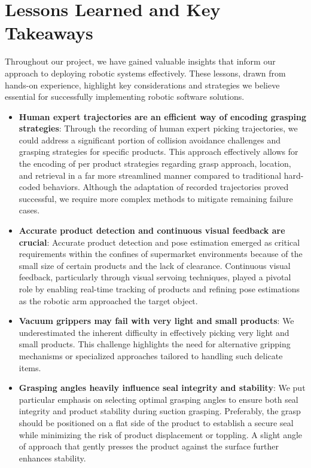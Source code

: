 \section{Lessons Learned and Key Takeaways}

Throughout our project, we have gained valuable insights that inform our approach to deploying robotic systems effectively. These lessons, drawn from hands-on experience, highlight key considerations and strategies we believe essential for successfully implementing robotic software solutions.

\begin{itemize}

    \item \textbf{Human expert trajectories are an efficient way of encoding grasping strategies}: 
    Through the recording of human expert picking trajectories, we could address a significant portion of collision avoidance challenges and grasping strategies for specific products. This approach effectively allows for the encoding of per product strategies regarding grasp approach, location, and retrieval in a far more streamlined manner compared to traditional hard-coded behaviors. Although the adaptation of recorded trajectories proved successful, we require more complex methods to mitigate remaining failure cases.
    
    \item \textbf{Accurate product detection and continuous visual feedback are crucial}:
    Accurate product detection and pose estimation emerged as critical requirements within the confines of supermarket environments because of the small size of certain products and the lack of clearance. Continuous visual feedback, particularly through visual servoing techniques, played a pivotal role by enabling real-time tracking of products and refining pose estimations as the robotic arm approached the target object.

    \item \textbf{Vacuum grippers may fail with very light and small products}:
    We underestimated the inherent difficulty in effectively picking very light and small products. This challenge highlights the need for alternative gripping mechanisms or specialized approaches tailored to handling such delicate items.

    \item \textbf{Grasping angles heavily influence seal integrity and stability}:
    We put particular emphasis on selecting optimal grasping angles to ensure both seal integrity and product stability during suction grasping. Preferably, the grasp should be positioned on a flat side of the product to establish a secure seal while minimizing the risk of product displacement or toppling. A slight angle of approach that gently presses the product against the surface further enhances stability.


\end{itemize}
